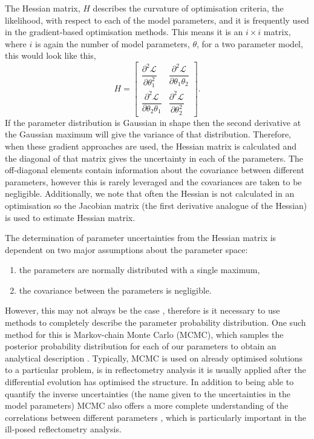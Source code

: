 \documentclass[
 reprint,
 superscriptaddress,
 amsmath,amssymb,
 aps,
]{revtex4-1}
\begin{document}
The Hessian matrix, $H$ describes the curvature of optimisation criteria, the likelihood, with respect to each of the model parameters, and it is frequently used in the gradient-based optimisation methods. 
This means it is an $i\times i$ matrix, where $i$ is again the number of model parameters, $\theta$, for a two parameter model, this would look like this,
%
\begin{equation}
    H = 
    \begin{bmatrix}
        \dfrac{\partial^2 \mathcal{L}}{\partial \theta_{1}^2} & \dfrac{\partial^2 \mathcal{L}}{\partial \theta_1 \theta_2} \\
        \dfrac{\partial^2 \mathcal{L}}{\partial \theta_2 \theta_1} & \dfrac{\partial^2 \mathcal{L}}{\partial \theta_{2}^2}
    \end{bmatrix}.
\end{equation}
%
If the parameter distribution is Gaussian in shape then the second derivative at the Gaussian maximum will give the variance of that distribution. 
Therefore, when these gradient approaches are used, the Hessian matrix is calculated and the diagonal of that matrix gives the uncertainty in each of the parameters. 
The off-diagonal elements contain information about the covariance between different parameters, however this is rarely leveraged and the covariances are taken to be negligible. 
Additionally, we note that often the Hessian is not calculated in an optimisation so the Jacobian matrix (the first derivative analogue of the Hessian) is used to estimate Hessian matrix. 

The determination of parameter uncertainties from the Hessian matrix is dependent on two major assumptions about the parameter space:
\begin{enumerate}
    \item {the parameters are normally distributed with a single maximum,}
    \item {the covariance between the parameters is negligible.}
\end{enumerate}
However, this may not always be the case \cite{mccluskey_bayesian_2019}, therefore is it necessary to use methods to completely describe the parameter probability distribution.
One such method for this is Markov-chain Monte Carlo (MCMC), which samples the posterior probability distribution for each of our parameters to obtain an analytical description \cite{sivia_data_2006}.
Typically, MCMC is used on already optimised solutions to a particular problem, is in reflectometry analysis it is usually applied after the differential evolution has optimised the structure. 
In addition to being able to quantify the inverse uncertainties (the name given to the uncertainties in the model parameters) MCMC also offers a more complete understanding of the correlations between different parameters \cite{gilks_markov_1995}, which is particularly important in the ill-posed reflectometry analysis. 
\end{document}
